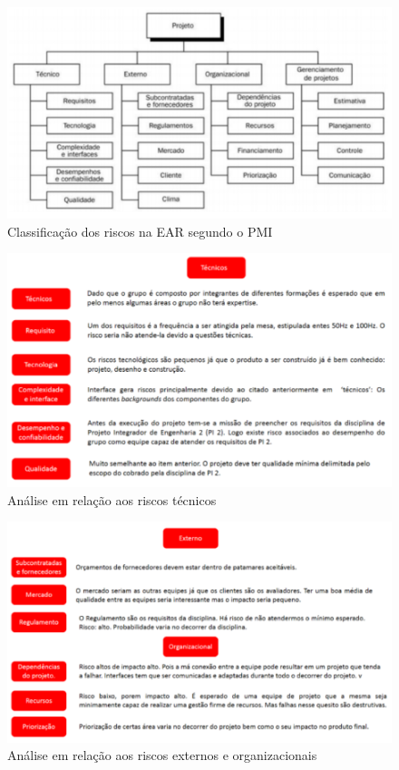 \begin{apendicesenv}
	\graphicspath{{figuras/}}
	\begin{figure}[h!]
	\centering
	\includegraphics[scale=0.80]{classificacao_de_riscos.png}
	\caption{Classificação dos riscos na EAR segundo o PMI}
	\label{img:classificacao_de_riscos}
	\end{figure}
	
	\graphicspath{{figuras/}}
	\begin{figure}[h!]
	\centering
	\includegraphics[scale=0.80]{analise_riscos_tecnicos.png}
	\caption{Análise em relação aos riscos técnicos}
	\label{img:analise_riscos_tecnicos}
	\end{figure}
	
	\graphicspath{{figuras/}}
	\begin{figure}[h!]
	\centering
	\includegraphics[scale=0.80]{analise_riscos_externos.png}
	\caption{Análise em relação aos riscos externos e organizacionais}
	\label{img:analise_riscos_externos}
	\end{figure}	
	

\end{apendicesenv}
